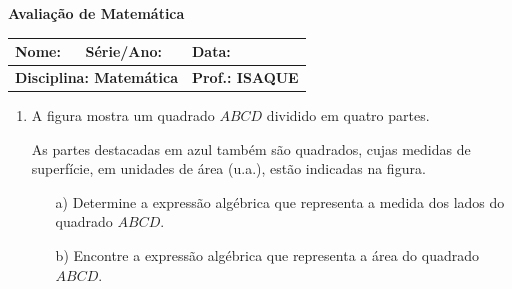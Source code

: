 \documentclass[a4paper,11pt]{article}
\begin{document}
	
	\vspace{-1cm}
	\begin{center}
		\textbf{\Large Avaliação de Matemática}\\[0.3cm]
		\begin{tabular}{|p{7cm}|p{4cm}|p{4cm}|}
			\hline
			\textbf{Nome:} & \textbf{Série/Ano:} & \textbf{Data:} \\	
			\hline
			\multicolumn{2}{|l|}{\textbf{Disciplina: Matemática}} & \textbf{Prof.: ISAQUE} \\
			\hline
		\end{tabular}
	\end{center}
	
	\vspace{-0.5cm}
	
	\begin{enumerate}[label=\textbf{\arabic*.}, itemsep=1.2cm]
		
		\item A figura mostra um quadrado \(ABCD\) dividido em quatro partes.
		
		\begin{multicols}{2}
				\begin{center}
			\end{center}
			
			As partes destacadas em azul também são quadrados, cujas
			medidas de superfície, em unidades de área (u.a.), estão indicadas na figura.
			
			\begin{enumerate}
				\item[a)] Determine a expressão algébrica que representa a medida dos lados do quadrado \(ABCD\).
				\item[b)] Encontre a expressão algébrica que representa a área do quadrado \(ABCD\).
			\end{enumerate}
		\end{multicols}
		

\end{enumerate}
\end{document}
